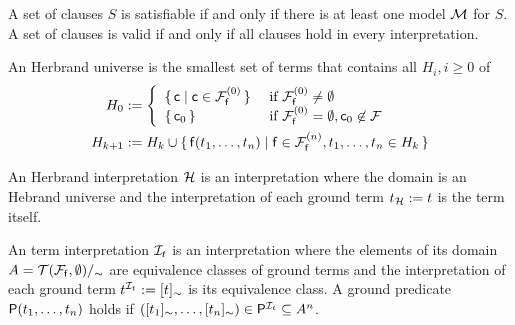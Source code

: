 \begin{definition}
	A set of clauses $S$ is {\myem satisfiable} if and only if there is at least one model ${\mathcal M}$ for $S$. 
	A set of clauses is  {\myem valid} if and only if all clauses hold in every interpretation.
\end{definition}

\begin{definition}\label{def:hk}
	An {\myem Herbrand universe} is the smallest set of terms that contains all $H_i, i\geq 0$ of
	\begin{align*}
	H_0 &:= \left\{ 
	\begin{array}{ll}
	\{\,\mc \mid \mc\in\mcFfn[0]\,\} 
	&\text{if } \mcFfn[0]\not=\emptyset\\
	\{\,\mc_0\,\}
	&\text{if } \mcFfn[0]=\emptyset, \mc_0\not\in\mcF
	\end{array}
	\right. 
	\\
	H_{k+1} &:= H_k \cup 
	\{\,  
	\mf(t_1,\ldots,t_n) \mid
	\mf\in\mcFfn[n],
	t_1,\ldots,t_n \in H_k
	\,\}
	\end{align*}
	
\end{definition}

\begin{definition}
	An {\myem Herbrand interpretation} ${\mathcal H}$ is an interpretation where the domain 
	is an Hebrand universe
	and the interpretation of each ground term $t_{\mathcal H} := t$ is the term itself.
\end{definition}


\begin{definition}
	An {\myem term interpretation} 
	${\mathcal I}_t$ 
	is an interpretation 
	where the elements of its domain $A = {{\mathcal T}({\mathcal F}_{\mathsf f},\emptyset)}/_\sim$ 
		are equivalence classes of ground terms
		and the interpretation of each ground term $t^{{\mathcal I}_t} := [t]_\sim$ is its equivalence class.
	 A ground predicate ${\mathsf P}(t_1,\ldots,t_n)$ holds if 
	 $([t_1]_\sim,\ldots,[t_n]_\sim) \in {\mathsf P}^{{\mathcal I}_t} \subseteq A^n$.
	
\end{definition}

